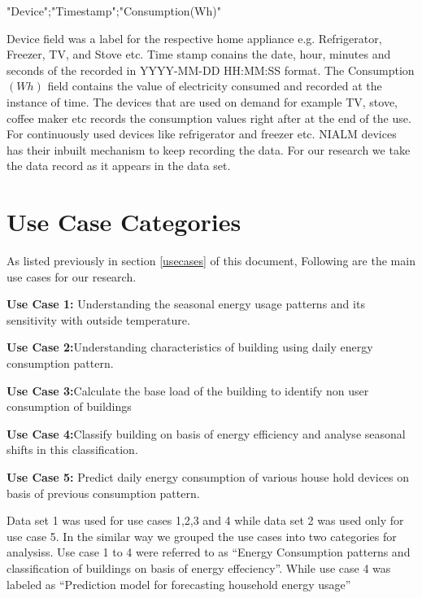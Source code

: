 "Device";"Timestamp";"Consumption(Wh)"

Device field was a label for the respective home appliance e.g. Refrigerator, Freezer, TV, and Stove etc. Time stamp conains the date, hour, minutes and seconds of the recorded in  YYYY-MM-DD HH:MM:SS format. The Consumption\((Wh)\) field contains the value of electricity consumed and recorded at the instance of time. The devices that are used on demand for example TV, stove, coffee maker etc records the consumption values right after at the end of the use. For continuously used devices like refrigerator and freezer etc. NIALM devices has their inbuilt mechanism to keep recording the data. For our research we take the data record as it appears in the data set.   

\section{Use Case Categories}

As listed previously in section \ref{usecases} of this document, Following are the main use cases for our research.

\textbf{Use Case 1:} Understanding the seasonal energy usage patterns and its sensitivity with outside temperature.

\textbf{Use Case 2:}Understanding characteristics of building using daily energy consumption pattern.

\textbf{Use Case 3:}Calculate the base load of the building to identify non user consumption of buildings

\textbf{Use Case 4:}Classify building on basis of energy efficiency and analyse seasonal shifts in this classification.

\textbf{Use Case 5:} Predict daily energy consumption of various house hold devices on basis of previous consumption pattern.

Data set 1 was used for use cases 1,2,3 and 4 while data set 2 was used only for use case 5. In the similar way we grouped the use cases into two categories for analysiss. Use case 1 to 4 were referred to as ``Energy Consumption patterns and classification of buildings on basis of energy effeciency''. While use case 4 was labeled as ``Prediction model for forecasting household energy usage''


